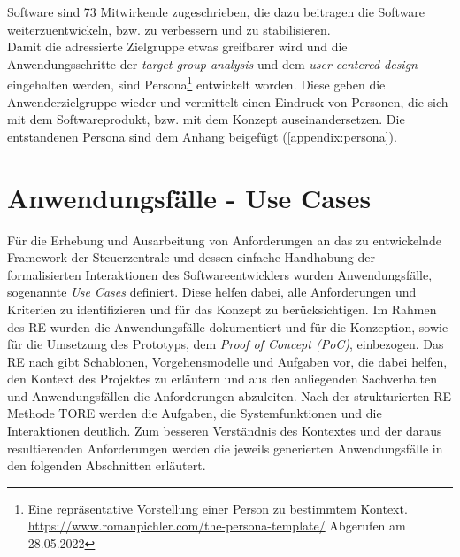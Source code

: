         Software sind 73 Mitwirkende zugeschrieben, die dazu beitragen die Software weiterzuentwickeln, bzw. zu verbessern und zu 
        stabilisieren.
    \\
    \linebreak 
    Damit die adressierte Zielgruppe etwas greifbarer wird und die Anwendungsschritte der \textit{target group analysis} und 
    dem \textit{user-centered design} eingehalten werden, sind Persona\footnote{Eine repräsentative Vorstellung einer Person zu bestimmtem Kontext. \url{https://www.romanpichler.com/the-persona-template/} Abgerufen am 28.05.2022} 
    entwickelt worden. Diese geben die Anwenderzielgruppe wieder und vermittelt einen Eindruck von Personen, die sich mit dem 
    Softwareprodukt, bzw. mit dem Konzept auseinandersetzen. Die entstandenen Persona sind dem Anhang beigefügt 
    (\ref{appendix:persona}).

\section{Anwendungsfälle - Use Cases}
\label{sec:usecases}
    Für die Erhebung und Ausarbeitung von Anforderungen an das zu entwickelnde Framework der Steuerzentrale und dessen 
    einfache Handhabung der formalisierten Interaktionen des Softwareentwicklers wurden Anwendungsfälle, sogenannte 
    \textit{Use Cases} definiert. Diese helfen dabei, alle Anforderungen und Kriterien zu identifizieren und für das 
    Konzept zu berücksichtigen. Im Rahmen des \acl{RE} wurden die Anwendungsfälle dokumentiert und für die Konzeption, sowie 
    für die Umsetzung des Prototyps, dem \textit{Proof of Concept (PoC)}, einbezogen. 
    Das \acs{RE} nach \cite{pohl2021basiswissen} gibt Schablonen, Vorgehensmodelle und Aufgaben 
    vor, die dabei helfen, den Kontext des Projektes zu erläutern und aus den anliegenden Sachverhalten und Anwendungsfällen 
    die Anforderungen abzuleiten. Nach der strukturierten \acs{RE} Methode \ac{TORE} \cite{tore2014} werden die 
    Aufgaben, die Systemfunktionen und die Interaktionen deutlich. Zum besseren Verständnis des Kontextes und der daraus 
    resultierenden Anforderungen werden die jeweils generierten Anwendungsfälle in den folgenden Abschnitten 
    erläutert.
    \\
    \linebreak
